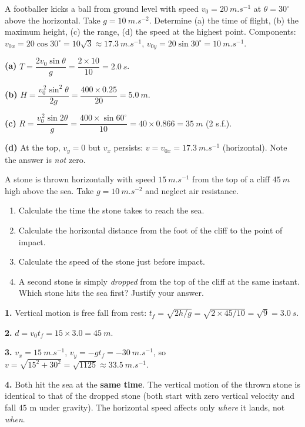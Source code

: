 \documentclass[11pt]{article}
\providecommand{\degree}{^{\circ}}
\begin{document}
\begin{exoresolu}
A footballer kicks a ball from ground level with speed $v_0 = \SI{20}{m.s^{-1}}$ at $\theta = 30\degree$ above the horizontal. Take $g = \SI{10}{m.s^{-2}}$. Determine (a) the time of flight, (b) the maximum height, (c) the range, (d) the speed at the highest point.
\tcblower
Components: $v_{0x} = 20\cos 30\degree = 10\sqrt{3} \approx \SI{17.3}{m.s^{-1}}$, $v_{0y} = 20\sin 30\degree = \SI{10}{m.s^{-1}}$.

\textbf{(a)} $T = \dfrac{2v_0\sin\theta}{g} = \dfrac{2\times 10}{10} = \SI{2.0}{s}$.

\textbf{(b)} $H = \dfrac{v_0^{\,2}\sin^2\theta}{2g} = \dfrac{400\times 0.25}{20} = \SI{5.0}{m}$.

\textbf{(c)} $R = \dfrac{v_0^{\,2}\sin 2\theta}{g} = \dfrac{400\times\sin 60\degree}{10} = 40\times 0.866 = \SI{35}{m}$ (2 s.f.).

\textbf{(d)} At the top, $v_y = 0$ but $v_x$ persists: $v = v_{0x} = \SI{17.3}{m.s^{-1}}$ (horizontal). Note the answer is \emph{not} zero.
\end{exoresolu}

\begin{exercice}[Practice]
A stone is thrown horizontally with speed $\SI{15}{m.s^{-1}}$ from the top of a cliff $\SI{45}{m}$ high above the sea. Take $g = \SI{10}{m.s^{-2}}$ and neglect air resistance.
\begin{enumerate}
\item Calculate the time the stone takes to reach the sea.
\item Calculate the horizontal distance from the foot of the cliff to the point of impact.
\item Calculate the speed of the stone just before impact.
\item A second stone is simply \emph{dropped} from the top of the cliff at the same instant. Which stone hits the sea first? Justify your answer.
\end{enumerate}
\end{exercice}

\begin{corrige}[Exercise 1]
\textbf{1.} Vertical motion is free fall from rest: $t_f = \sqrt{2h/g} = \sqrt{2\times 45/10} = \sqrt{9} = \SI{3.0}{s}$.

\textbf{2.} $d = v_0 t_f = 15\times 3.0 = \SI{45}{m}$.

\textbf{3.} $v_x = \SI{15}{m.s^{-1}}$, $v_y = -gt_f = \SI{-30}{m.s^{-1}}$, so $v = \sqrt{15^2 + 30^2} = \sqrt{1125} \approx \SI{33.5}{m.s^{-1}}$.

\textbf{4.} Both hit the sea at the \textbf{same time}. The vertical motion of the thrown stone is identical to that of the dropped stone (both start with zero vertical velocity and fall $45$ m under gravity). The horizontal speed affects only \emph{where} it lands, not \emph{when}.
\end{corrige}
\end{document}
